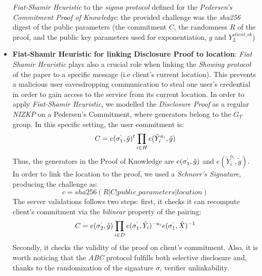 \documentclass[10pt,conference,compsocconf]{IEEEtran}
\begin{document}
\begin{itemize}
    \textit{Fiat-Shamir Heuristic} to the \textit{sigma protocol} defined for
    the \textit{Pedersen's Commitment Proof of Knowledge}: the provided
    challenge was the \textit{sha256} digest of the public parameters (the
    commitment $C$, the randomness $R$ of the proof, and the public key
    parameters used for exponentiation, $g$ and $Y_{L}^{client\_sk}$)
    \item \textbf{Fiat-Shamir Heuristic for linking Disclosure Proof to
    location}: \textit{Fiat Shamir Heuristic} plays also a crucial role when
    linking the \textit{Showing protocol} of the paper to a specific message
    (i.e client's current location). This prevents a malicious user
    eavesdropping communication to steal one user's credential in order to gain
    access to the service from its current location. In order to apply
    \textit{Fiat-Shamir Heuristic}, we modelled the \textit{Disclosure Proof} as
    a regular \textit{NIZKP} on a Pedersen's Commitment, where generators belong
    to the $G_T$ group.\newline
    In this specific setting, the user commitment is: \[C=e(\sigma_{1}^{`},
    \tilde{g})^t\prod_{i \in H}e(\tilde{Y}_{i}^{a_i},\tilde{g})\]Thus, the
    generators in the Proof of Knowledge are $e(\sigma_{1}^{`}, \tilde{g})$ and
    $e(\tilde{Y}_{i}^{a_i},\tilde{g})$. In order to link the location to the
    proof, we used a \textit{Schnorr's Signature}, producing the challenge as:
    \[c = sha256(R|C|public\_parameters|location)\] The server validations
    follows two steps: first, it checks it can recompute client's commitment via
    the \textit{bilinear} property of the pairing:
    \[C = e(\sigma_2^`,\tilde{g})\prod_{i \in
    D}e(\sigma_1^`,\tilde{Y}_i)^{-a_i}e(\sigma_1^`,\tilde{X})^{-1}\] Secondly,
    it checks the validity of the proof on client's commitment. Also, it is
    worth noticing that the \textit{ABC} protocol fulfills both selective
    disclosure and, thanks to the randomization of the signature $\sigma$,
    verifier unlinkability.
\end{itemize}
\end{document}

